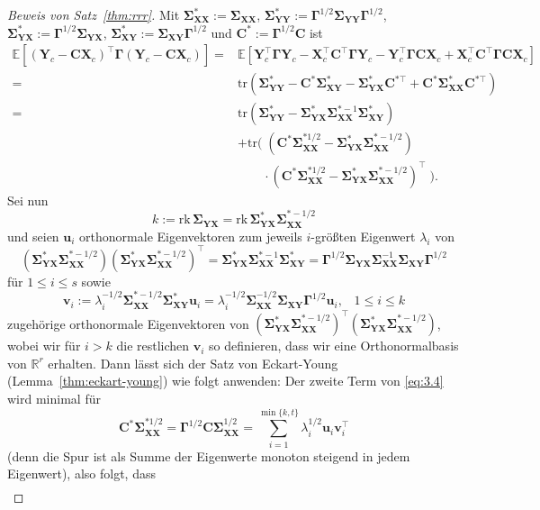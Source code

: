 \documentclass[]{article}
\newcommand{\E}{\mathbb{E}}
\newcommand{\R}{\mathbb{R}}
\newcommand{\X}{\mathbf{X}}
\newcommand{\Y}{\mathbf{Y}}
\newcommand{\Ssigma}{\mathbf{\Sigma}}
\newcommand{\vv}{\mathbf{v}}
\newcommand{\uu}{\mathbf{u}}
\newcommand{\C}{\mathbf{C}}
\newcommand{\rk}{\mathrm{rk}}
\newcommand{\Ggamma}{\mathbf{\Gamma}}
\newcommand{\tr}{\mathrm{tr}}
\begin{document}
\begin{proof}[Beweis von Satz~\ref{thm:rrr}]
	Mit $\Ssigma_{\X\X}^\ast := \Ssigma_{\X\X}$, $\Ssigma_{\Y\Y}^\ast := \Ggamma^{1/2} \Ssigma_{\Y\Y} \Ggamma^{1/2}$, $\Ssigma_{\Y\X}^\ast := \Ggamma^{1/2} \Ssigma_{\Y\X}$, $\Ssigma_{\X\Y}^\ast := \Ssigma_{\X\Y} \Ggamma^{1/2}$ und $\C^\ast := \Ggamma^{1/2} \C$ ist
	\begin{align*}
		\E[(\Y_c - \C \X_c)^\top \Ggamma (\Y_c - \C \X_c)] ={}& \E[\Y_c^\top \Ggamma \Y_c - \X_c^\top \C^\top \Ggamma \Y_c - \Y_c^\top \Ggamma \C
		\X_c + \X_c^\top \C^\top \Ggamma \C \X_c] \\
		={}& \tr(\Ssigma_{\Y\Y}^\ast - \C^\ast \Ssigma_{\X\Y}^\ast - \Ssigma_{\Y\X}^\ast \C^{\ast
			\top} + \C^\ast \Ssigma_{\X\X}^\ast \C^{\ast \top}) \\
		={}& \tr(\Ssigma_{\Y\Y}^\ast - \Ssigma_{\Y\X}^\ast \Ssigma_{\X\X}^{\ast -1}
		\Ssigma_{\X\Y}^\ast) \\
		&+ \tr( \; (\C^\ast \Ssigma_{\X\X}^{\ast 1/2} - \Ssigma_{\Y\X}^\ast \Ssigma_{\X\X}^{\ast -1/2}) \\
		& \qquad \cdot (\C^\ast \Ssigma_{\X\X}^{\ast 1/2} - \Ssigma_{\Y\X}^\ast \Ssigma_{\X\X}^{\ast -1/2})^\top \; ) \text{.} \label{eq:3.4} \tag{3.4}                                                   
	\end{align*}
    Sei nun
    $$k:= \rk \, \Ssigma_{\Y\X} = \rk \, \Ssigma_{\Y\X}^\ast \Ssigma_{\X\X}^{\ast -1/2}$$
    und seien $\uu_i$ orthonormale Eigenvektoren zum jeweils $i$-größten Eigenwert $\lambda_i$ von
	$$(\Ssigma_{\Y\X}^\ast \Ssigma_{\X\X}^{\ast -1/2})(\Ssigma_{\Y\X}^\ast \Ssigma_{\X\X}^{\ast -1/2})^\top = \Ssigma_{\Y\X}^\ast \Ssigma_{\X\X}^{\ast -1} \Ssigma_{\X\Y}^\ast = \Ggamma^{1/2} \Ssigma_{\Y\X} \Ssigma_{\X\X}^{-1} \Ssigma_{\X\Y} \Ggamma^{1/2}$$
	für $1 \leq i \leq s$ sowie 
	$$\vv_i := \lambda_i^{-1/2} \Ssigma_{\X\X}^{\ast -1/2} \Ssigma_{\X\Y}^\ast \uu_i = \lambda_i^{-1/2} \Ssigma_{\X\X}^{-1/2} \Ssigma_{\X\Y} \Ggamma^{1/2} \uu_i\text{,} \quad 1 \leq i \leq k$$
	zugehörige orthonormale Eigenvektoren von $(\Ssigma_{\Y\X}^\ast \Ssigma_{\X\X}^{\ast -1/2})^\top(\Ssigma_{\Y\X}^\ast \Ssigma_{\X\X}^{\ast -1/2})$, wobei wir für $i > k$ die restlichen $\vv_i$ so definieren, dass wir eine Orthonormalbasis von $\R^r$ erhalten. Dann lässt sich der Satz von Eckart-Young (Lemma~\ref{thm:eckart-young}) wie folgt anwenden: Der zweite Term von \eqref{eq:3.4} wird minimal für 
	$$\C^\ast \Ssigma_{\X\X}^{\ast 1/2} = \Ggamma^{1/2} \C \Ssigma_{\X\X}^{1/2} = \sum_{i=1}^{\min\{k, t\}} \lambda_i^{1/2} \uu_i \vv_i^\top$$
	(denn die Spur ist als Summe der Eigenwerte monoton steigend in jedem Eigenwert), also folgt, dass
	\begin{align*}

\end{align*}
\end{proof}
\end{document}
